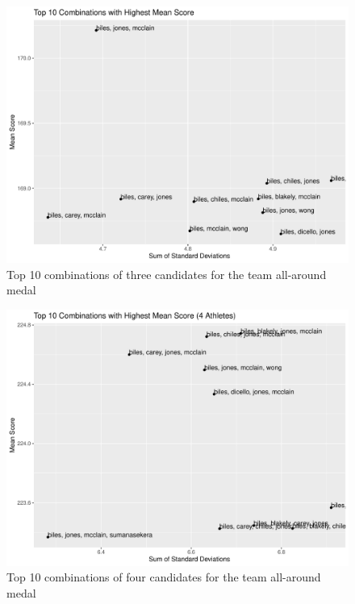 \documentclass[12pt]{article}
\begin{document}
\begin{figure}[tbp]
  \centering
  \includegraphics[scale=0.6]{TeamCombinations3.pdf}
  \caption{Top 10 combinations of three candidates for the team all-around medal}
  \label{fig:AA3}
\end{figure}

\begin{figure}[tbp]
  \centering
  \includegraphics[scale=0.6]{TeamCombinations4.pdf}
  \caption{Top 10 combinations of four candidates for the team all-around medal}
  \label{fig:AA4}
\end{figure}
\end{document}
